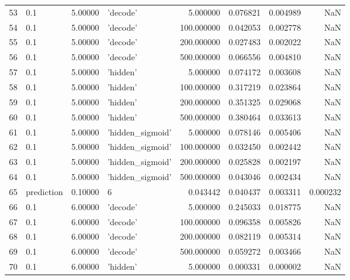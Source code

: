 \documentclass[10pt,a4paper]{article}
\begin{document}
\begin{tabular}{llrlrrrr}
53   &         0.1 &   5.00000 &           'decode' &    5.000000 &  0.076821 &  0.004989 &       NaN \\
54   &         0.1 &   5.00000 &           'decode' &  100.000000 &  0.042053 &  0.002778 &       NaN \\
55   &         0.1 &   5.00000 &           'decode' &  200.000000 &  0.027483 &  0.002022 &       NaN \\
56   &         0.1 &   5.00000 &           'decode' &  500.000000 &  0.066556 &  0.004810 &       NaN \\
57   &         0.1 &   5.00000 &           'hidden' &    5.000000 &  0.074172 &  0.003608 &       NaN \\
58   &         0.1 &   5.00000 &           'hidden' &  100.000000 &  0.317219 &  0.023864 &       NaN \\
59   &         0.1 &   5.00000 &           'hidden' &  200.000000 &  0.351325 &  0.029068 &       NaN \\
60   &         0.1 &   5.00000 &           'hidden' &  500.000000 &  0.380464 &  0.033613 &       NaN \\
61   &         0.1 &   5.00000 &   'hidden\_sigmoid' &    5.000000 &  0.078146 &  0.005406 &       NaN \\
62   &         0.1 &   5.00000 &   'hidden\_sigmoid' &  100.000000 &  0.032450 &  0.002442 &       NaN \\
63   &         0.1 &   5.00000 &   'hidden\_sigmoid' &  200.000000 &  0.025828 &  0.002197 &       NaN \\
64   &         0.1 &   5.00000 &   'hidden\_sigmoid' &  500.000000 &  0.043046 &  0.002434 &       NaN \\
65   &  prediction &   0.10000 &                  6 &    0.043442 &  0.040437 &  0.003311 &  0.000232 \\
66   &         0.1 &   6.00000 &           'decode' &    5.000000 &  0.245033 &  0.018775 &       NaN \\
67   &         0.1 &   6.00000 &           'decode' &  100.000000 &  0.096358 &  0.005826 &       NaN \\
68   &         0.1 &   6.00000 &           'decode' &  200.000000 &  0.082119 &  0.005314 &       NaN \\
69   &         0.1 &   6.00000 &           'decode' &  500.000000 &  0.059272 &  0.003466 &       NaN \\
70   &         0.1 &   6.00000 &           'hidden' &    5.000000 &  0.000331 &  0.000002 &       NaN \\

\end{tabular}
\end{document}
